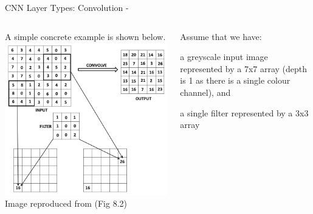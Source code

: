 \begin{frame}[t,allowframebreaks]{CNN Layer Types: Convolution -}
    \begin{columns}[t]
        \begin{column}{0.50\textwidth}
            \vspace{-0.4cm}
            \begin{center}
                {\scriptsize A simple concrete example is shown below.}\\
                \includegraphics[width=1.00\textwidth]
                  {./images/cnn/convolution/aggarwal_convolution_illustration_1.png}\\
                {\scriptsize 
                  \color{col:attribution} 
                  Image reproduced from \cite{Aggarwal:2018SpringerDL} (Fig 8.2)}\\    
            \end{center}      
        \end{column}
        \begin{column}{0.50\textwidth}
        {\scriptsize
            Assume that we have:
            \begin{itemize}
            {\scriptsize        
              \item 
              a greyscale input image represented by a 7x7 array
              (depth is 1 as there is a single colour channel), 
              and 
              \item
              a single filter represented by a 3x3 array
}
\end{itemize}}
\end{column}
\end{columns}
\end{frame}
